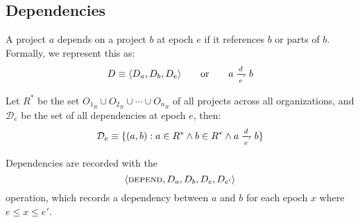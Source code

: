 \subsection{Dependencies}
\label{dependencies}

A project $a$ depends on a project $b$ at epoch $e$ if it references $b$
or parts of $b$. Formally, we represent this as:
\[
    D \equiv \tuple{D_a, D_b, D_e} \qquad \text{or} \qquad a \dep b
\]


Let $R^*$ be the set $O_{1_R} \cup O_{2_R} \cup \cdots \cup
O_{n_R}$ of all projects across all organizations, and $\mathcal{D}_e$ be the
set of all dependencies at epoch $e$, then:
\[
    \mathcal{D}_e \equiv \{(a, b) : a \in R^*
    \land b \in R^*
    \land a \dep b \}
\]

Dependencies are recorded with the
\[
    \langle \text{\normalfont\scshape depend}, D_a, D_b, D_e, D_{e'} \rangle
\]
operation, which records a dependency between $a$ and $b$ for each epoch $x$
where $e \leqslant x \leqslant e'$.
